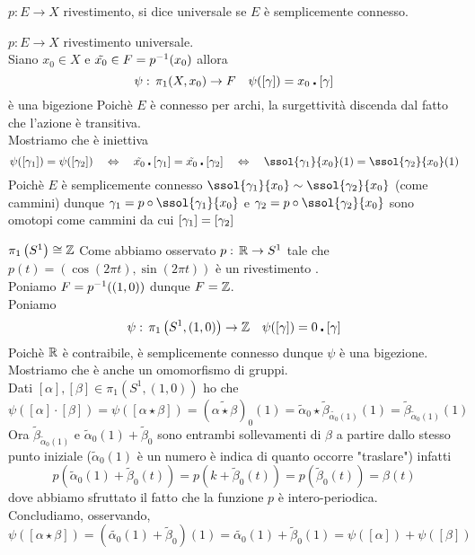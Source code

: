 \spazio
\begin{defn}$p:E \to X$ rivestimento, si dice universale se $E$ \`e semplicemente connesso.
\end{defn}
\begin{prop}$p:E \to X$ rivestimento universale.\\
Siano $x_0\in X$ e $\tilde{x_0}\in F = p^{-1}(x_0)$ allora 
$$ \psi:\, \pi_1(X,x_0) \to F \quad \psi([\gamma])=x_0 \centerdot [\gamma]$$
\`e una bigezione
\proof
Poich\`e $E$ \`e connesso per archi, la surgettivit\`a discenda dal fatto che l'azione \`e transitiva.\\
Mostriamo che \`e iniettiva
$$ \psi ([ \gamma_1]) = \psi ([\gamma_2]) \quad \ses \quad \tilde{x_0}\az[\gamma_1] = \tilde{x_0}\az [\gamma_2] \quad \ses \quad \ssol{\gamma_1}{x_0} (1)= \ssol {\amma_2}{x_0}(1)$$
Poich\`e $E$ \`e semplicemente connesso 
$\ds \ssol{\gamma_1}{x_0} \sim \ssol {\amma_2}{x_0}$ (come cammini) 
dunque $\gamma_1=p \circ \ssol{\gamma_1}{x_0}$ e $\gamma_2=p \circ \ssol{\gamma_2}{x_0}$ sono omotopi come cammini da cui $[\gamma_1]=[\gamma_2]$
\endproof
\end{prop}
\spazio
\begin{thm}$\pi_1\left( S^1 \right) \cong \mathbb{Z}$
\proof Come abbiamo osservato $p:\, \mathbb{R} \to S^1 $ tale che $p(t)=(\cos (2\pi t ), \sin (2\pi t))$ \`e un rivestimento .\\
Poniamo $F=p^{-1}((1,0))$ dunque $F=\mathbb{Z}$.\\
Poniamo 
$$ \psi:\, \pi_1\left( S^1, (1,0) \right) \to \mathbb{Z} \quad \psi([\gamma])= 0 \centerdot [\gamma]$$
Poich\`e $\mathbb{R}$ \`e contraibile, \`e semplicemente connesso dunque $\psi$ \`e una bigezione.\\
Mostriamo che \`e anche un omomorfismo di gruppi.\\
Dati $[\alpha], [\beta]\in \pi_1\left( S^1,(1,0) \right)$ ho che 
$$ \psi ([\alpha]\cdot [\beta])=\psi([\alpha\star \beta])= \left(\tilde{\alpha\star \beta}\right)_0 (1)= \tilde{\alpha}_0 \star \tilde{\beta}_{\tilde{\alpha_0}(1)}(1)=\tilde{\beta}_{\tilde{\alpha}_0(1)}(1)$$
Ora $\tilde{\beta}_{{\tilde{\alpha}}_0(1)}$ e $\tilde{\alpha}_0(1)+\tilde{\beta}_0$ sono entrambi sollevamenti di $\beta$ a partire dallo stesso punto iniziale ($\tilde{\alpha}_0(1)$ \`e un numero \`e indica di quanto occorre "traslare") infatti
$$ p\left( \tilde{\alpha}_0(1)+\tilde{\beta}_0(t) \right)= p\left( k + \tilde{\beta}_0(t) \right)= p\left( \tilde{\beta}_0(t) \right)=\beta(t)$$
dove abbiamo sfruttato il fatto che la funzione $p$ \`e intero-periodica.\\
Concludiamo, osservando, 
$$ \psi([\alpha\star \beta])=\left(\tilde{\alpha_0}(1)+\tilde{\beta}_0\right)(1)=\tilde{\alpha_0}(1)+\tilde{\beta}_0(1) =\psi([\alpha])+\psi([\beta])$$
\end{thm}
